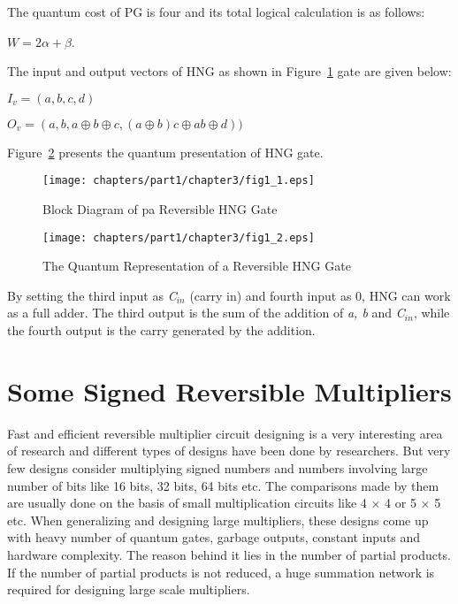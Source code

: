 \noindent The quantum cost of PG is four and its total logical calculation is as follows:

\begin{center}
	$W = 2\alpha +\beta$.
\end{center}



\noindent The input and output vectors of HNG as shown in Figure~\ref{fig:p1_c3_fig1_1} gate are given below:

\begin{center}
	{$I{}_{v} = (a, b, c, d)$}
\end{center}
\begin{center}
	$O{}_{v} = (a, b, a \oplus b \oplus c , (a \oplus b) c \oplus ab \oplus d))$	
\end{center}
Figure~\ref{fig:p1_c3_fig1_2} presents the quantum presentation of HNG gate.
\begin{figure}[h]
	\centering
	\texttt{[image: chapters/part1/chapter3/fig1\_1.eps]}
	\caption{Block Diagram of pa Reversible HNG Gate} 
	\label{fig:p1_c3_fig1_1}
\end{figure}

\begin{figure}[h]
	\centering
	\texttt{[image: chapters/part1/chapter3/fig1\_2.eps]}
	\caption{The Quantum Representation of a Reversible HNG Gate} 
	\label{fig:p1_c3_fig1_2}
\end{figure}

By setting the third input as \textit{C${}_{in}$} (carry in) and fourth input as {0}, HNG can work as a full adder. The third output is the sum of the addition of \textit{a, b} and \textit{C${}_{in}$}, while the fourth output is the carry generated by the addition. 

\section{Some Signed Reversible Multipliers}

Fast and efficient reversible multiplier circuit designing is a very interesting area of research and different types of designs have been done by researchers. But very few designs consider multiplying signed numbers and numbers involving large number of bits like {16} bits, {32} bits, {64} bits etc. The comparisons made by them are usually done on the basis of small multiplication circuits like {4 $\times$ 4} or {5 $\times$ 5} etc. When generalizing and designing large multipliers, these designs come up with heavy number of quantum gates, garbage outputs, constant inputs and hardware complexity. The reason behind it lies in the number of partial products. If the number of partial products is not reduced, a huge summation network is required for designing large scale multipliers.

